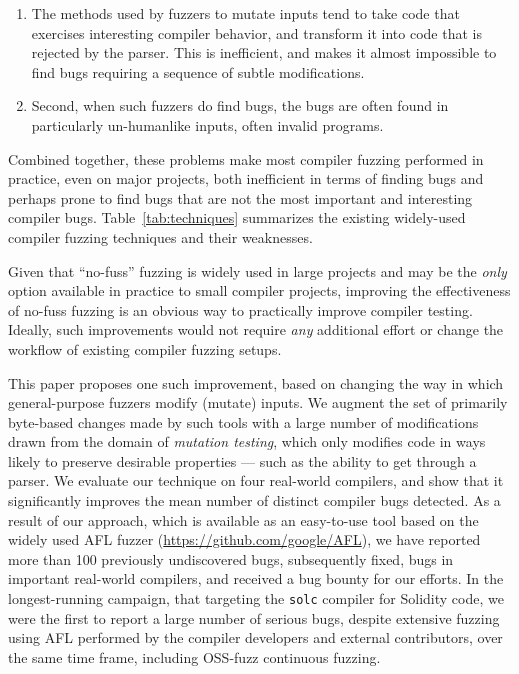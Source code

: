 \begin{enumerate}
\item The methods used by fuzzers to mutate inputs tend to take code that exercises interesting
  compiler behavior, and transform it into code that is rejected by
  the parser.  This is inefficient, and makes it
  almost impossible to find bugs requiring a sequence of subtle
  modifications.
  \item Second, when such fuzzers do find bugs, the bugs are often
    found in particularly un-humanlike inputs, often invalid programs.
  \end{enumerate}

  Combined together, these problems make most compiler fuzzing
  performed in practice, even on major projects, both inefficient in
  terms of finding bugs and perhaps prone to find bugs that are not
  the most important and interesting compiler bugs.
  Table~\ref{tab:techniques} summarizes the existing widely-used
  compiler fuzzing techniques and their weaknesses.

  Given that ``no-fuss'' fuzzing is widely used in large projects and
  may be the \emph{only} option available in
  practice to small compiler projects, improving the effectiveness of no-fuss fuzzing is an obvious way to practically improve compiler
  testing.  Ideally, such improvements would not require \emph{any}
  additional effort or change the workflow of existing compiler
  fuzzing setups.

  This paper proposes one such improvement, based on changing the way
  in which general-purpose fuzzers modify (mutate) inputs.  We augment
  the set of primarily byte-based changes made by such tools with a large number of
  modifications drawn from the domain of \emph{mutation testing},
  which only modifies code in ways likely to preserve desirable
  properties --- such as the ability to get through a parser.  We evaluate
  our technique on four real-world compilers, and show that it
  significantly improves the mean number of distinct compiler bugs
  detected.  As a
  result of our approach, which is available as an easy-to-use tool
  based on the widely used AFL fuzzer
  (\url{https://github.com/google/AFL}), we have reported more than
  100 previously undiscovered 
  bugs, subsequently fixed, bugs in important real-world compilers, and received a bug bounty for
  our efforts.  In the longest-running campaign, that targeting the
  {\tt solc} compiler for Solidity code, we were the first to
  report a large number of serious bugs, despite extensive
  fuzzing using AFL performed by the compiler developers
  and external contributors, over the same time frame, including
  OSS-fuzz continuous fuzzing.
